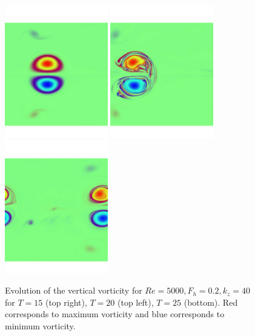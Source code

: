 \begin{figure}
\begin{center}
\includegraphics[width=0.4\textwidth]{struc_3}
\includegraphics[width=0.4\textwidth]{struc_4}
\includegraphics[width=0.4\textwidth]{struc_5}
\caption{Evolution of the vertical vorticity for $Re=5000, F_{h}=0.2, k_{z}=40$ for $T=15$ (top right), $T=20$ (top left), $T=25$ (bottom). Red corresponds to maximum vorticity and blue corresponds to minimum vorticity.}
\label{full_structure}
\end{center}
\end{figure}

